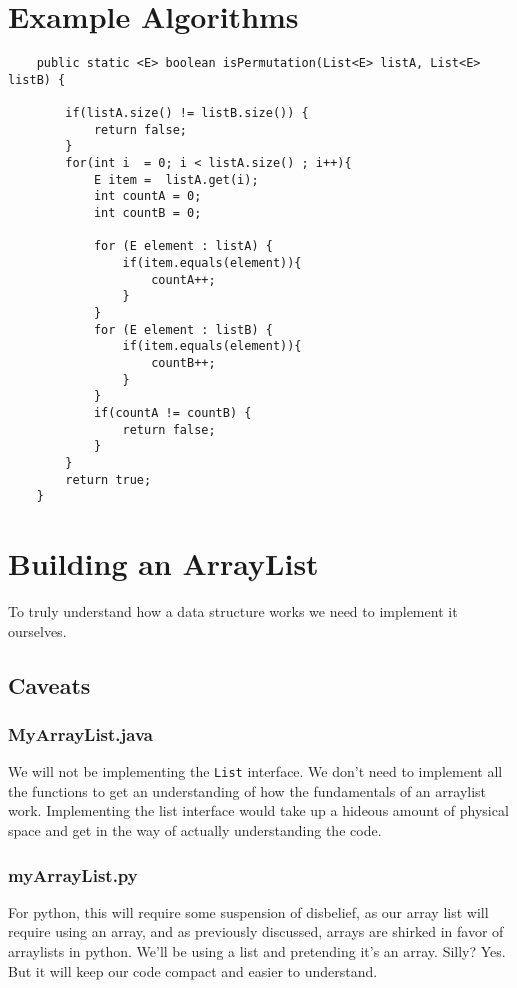 \section{Example Algorithms}


\begin{verbatim}
	public static <E> boolean isPermutation(List<E> listA, List<E> listB) {
		
		if(listA.size() != listB.size()) {
			return false;
		}
		for(int i  = 0; i < listA.size() ; i++){
			E item =  listA.get(i);
			int countA = 0;
			int countB = 0;
			
			for (E element : listA) {
				if(item.equals(element)){
					countA++;
				}
			}
			for (E element : listB) {
				if(item.equals(element)){
					countB++;
				}
			}
			if(countA != countB) {
				return false;
			}
		}
		return true;
	}
\end{verbatim}



\section{Building an ArrayList}
\label{buildingArraylist}
To truly understand how a data structure works we need to implement it ourselves.

\subsection{Caveats}

\subsubsection{MyArrayList.java}
We will not be implementing the \texttt{List} interface. We don't need to implement all the functions to get an understanding of how the fundamentals of an arraylist work.
Implementing the list interface would take up a hideous amount of physical space and get in the way of actually understanding the code.

\subsubsection{myArrayList.py}

For python, this will require some suspension of disbelief, as our array list will require using an array, and as previously discussed, arrays are shirked in favor of arraylists in python.  We'll be using a list and pretending it's an array. Silly?  Yes.  But it will keep our code compact and easier to understand.

